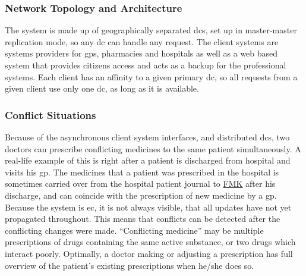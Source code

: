 \subsubsection{Network Topology and Architecture }
The system is made up of geographically separated \glspl{dc}, set up in master-master replication mode, so any \gls{dc} can handle any request. The client systems are systems providers for \glspl{gp}, pharmacies and hospitals as well as a web based system that provides citizens access and acts as a backup for the professional systems. Each client has an affinity to a given primary \gls{dc}, so all requests from a given client use only one \gls{dc}, as long as it is available.


\subsubsection{Conflict Situations}
Because of the asynchronous client system interfaces, and distributed \glspl{dc}, two doctors can prescribe conflicting medicines to the same patient simultaneously. A real-life example of this is right after a patient is discharged from hospital and visits his \gls{gp}. The medicines that a patient was prescribed in the hospital is sometimes carried over from the hospital patient journal to \href{https://www.trifork.com/news/a-prestigious-prize-trifork-public}{FMK} after his discharge, and can coincide with the prescription of new medicine by a \gls{gp}. Because the system is \gls{ec}, it is not always visible, that all updates have not yet propagated throughout. This means that conflicts can be detected after the conflicting changes were made. \textquotedblleft Conflicting medicine\textquotedblright{} may be multiple prescriptions of drugs containing the same active substance, or two drugs which interact poorly. Optimally, a doctor making or adjusting a prescription has full overview of the patient\textquoteright s existing prescriptions when he/she does so.